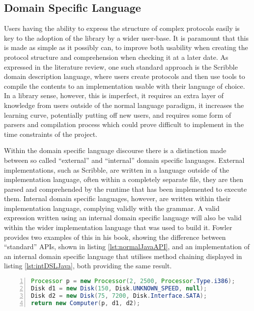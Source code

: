 \documentclass{article}
\begin{document}
	\subsection{Domain Specific Language}
	Users having the ability to express the structure of complex protocols easily is key to the adoption of the library by a wider user-base. It is paramount that this is made as simple as it possibly can, to improve both usability when creating the protocol structure and comprehension when checking it at a later date. As expressed in the literature review, one such standard approach is the Scribble\cite{honda2011scribbling} domain description language, where users create protocols and then use tools to compile the contents to an implementation usable with their language of choice. In a library sense, however, this is imperfect, it requires an extra layer of knowledge from users outside of the normal language paradigm, it increases the learning curve, potentially putting off new users, and requires some form of parsers and compilation process which could prove difficult to implement in the time constraints of the project.
	
	Within the domain specific language discourse there is a distinction made between so called ``external'' and ``internal'' domain specific languages\cite{Fowler:2010:DSL:1809745}. External implementations, such as Scribble, are written in a language outside of the implementation language, often within a completely separate file, they are then parsed and comprehended by the runtime that has been implemented to execute them. Internal domain specific languages, however, are written within their implementation language, complying validly with the grammar. A valid expression written using an internal domain specific language will also be valid within the wider implementation language that was used to build it. Fowler provides two examples of this in his book, showing the difference between ``standard'' APIs, shown in listing \ref{lst:normalJavaAPI}, and an implementation of an internal domain specific language that utilises method chaining displayed in listing \ref{lst:intDSLJava}, both providing the same result.
	
	\begin{lstlisting}[label={lst:normalJavaAPI}, language=java, frame=single, numbers=left, caption=Object construction in a normal API\cite{Fowler:2010:DSL:1809745}]
Processor p = new Processor(2, 2500, Processor.Type.i386);
Disk d1 = new Disk(150, Disk.UNKNOWN_SPEED, null);
Disk d2 = new Disk(75, 7200, Disk.Interface.SATA);
return new Computer(p, d1, d2);

	\end{lstlisting}
	
\end{document}
